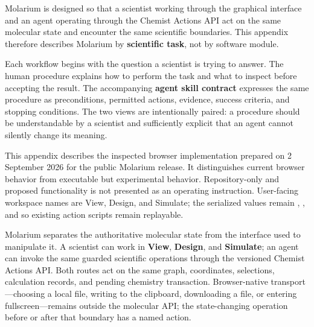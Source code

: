 \documentclass[11pt]{article}
\begin{document}
\newenvironment{smallcomparison}[1]{%
  \par\vspace{2pt}\footnotesize
  \begin{longtable}{@{}#1@{}}\toprule
}{%
  \bottomrule\end{longtable}
  \small}

Molarium is designed so that a scientist working through the graphical interface and an agent operating through the Chemist Actions API act on the same molecular state and encounter the same scientific boundaries. This appendix therefore describes Molarium by \textbf{scientific task}, not by software module.

Each workflow begins with the question a scientist is trying to answer. The human procedure explains how to perform the task and what to inspect before accepting the result. The accompanying \textbf{agent skill contract} expresses the same procedure as preconditions, permitted actions, evidence, success criteria, and stopping conditions. The two views are intentionally paired: a procedure should be understandable by a scientist and sufficiently explicit that an agent cannot silently change its meaning.

This appendix describes the inspected browser implementation prepared on 2 September 2026 for the public Molarium release. It distinguishes current browser behavior from executable but experimental behavior. Repository-only and proposed functionality is not presented as an operating instruction. User-facing workspace names are View, Design, and Simulate; the serialized values remain , , and  so existing action scripts remain replayable.


Molarium separates the authoritative molecular state from the interface used to manipulate it. A scientist can work in \textbf{View}, \textbf{Design}, and \textbf{Simulate}; an agent can invoke the same guarded scientific operations through the versioned Chemist Actions API. Both routes act on the same graph, coordinates, selections, calculation records, and pending chemistry transaction. Browser-native transport---choosing a local file, writing to the clipboard, downloading a file, or entering fullscreen---remains outside the molecular API; the state-changing operation before or after that boundary has a named action.
\end{document}
